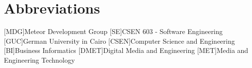 \appendix
\renewcommand{\appendixtocname}{Appendix}
\renewcommand{\appendixpagename}{\appendixtocname}
\addappheadtotoc
{}
\appendixpage

\chapter{Abbreviations}

\begin{acronym}[\hspace{3cm}]
  [MDG]{Meteor Development Group}
  [SE]{CSEN 603 - Software Engineering}
  [GUC]{German University in Cairo}
  [CSEN]{Computer Science and Engineering}
  [BI]{Business Informatics}
  [DMET]{Digital Media and Engineering}
  [MET]{Media and Engineering Technology \cite{metportal}}
\end{acronym}

\clearpage
\listoffigures
{}
